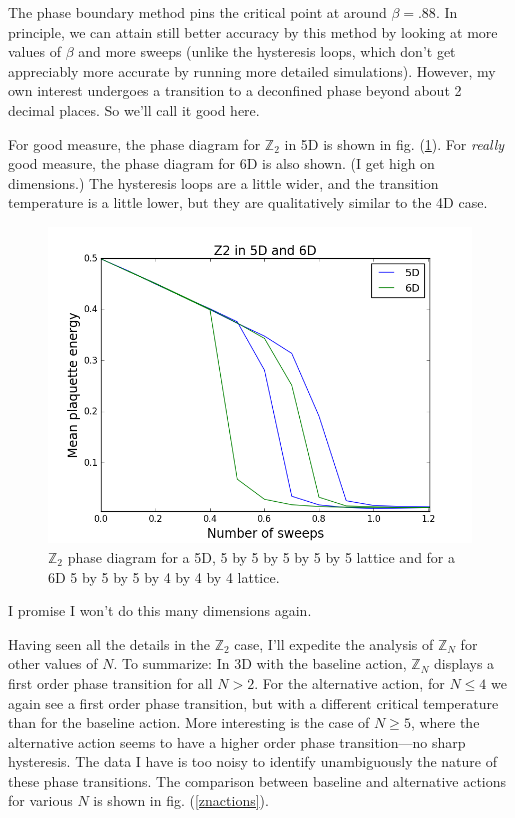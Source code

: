 \documentclass[9pt,twocolumn,twoside]{article}
\begin{document}
The phase boundary method pins the critical point at around $\beta= .88$.  In principle, we can attain still better accuracy by this method by looking at more values of $\beta$ and more sweeps (unlike the hysteresis loops, which don't get appreciably more accurate by running more detailed simulations).  However, my own interest undergoes a transition to a deconfined phase beyond about 2 decimal places.  So we'll call it good here. 

For good measure, the phase diagram for $\mathbb{Z}_2$ in 5D is shown in fig. (\ref{z2,56d}).  For \textit{really} good measure, the phase diagram for 6D is also shown.  (I get high on dimensions.)  The hysteresis loops are a little wider, and the transition temperature is a little lower, but they are qualitatively similar to the 4D case. 

\begin{figure}[h!]
	\begin{centering}
	\includegraphics[width=\columnwidth]{z2,56d}
	\caption{$\mathbb{Z}_2$ phase diagram for a 5D, 5 by 5 by 5 by 5 by 5 lattice and for a 6D 5 by 5 by 5 by 4 by 4 by 4 lattice.}
	\label{z2,56d}
	\end{centering}
\end{figure}

I promise I won't do this many dimensions again.  

Having seen all the details in the $\mathbb{Z}_2$ case, I'll expedite the analysis of $\mathbb{Z}_N$ for other values of $N$.  To summarize:  In 3D with the baseline action, $\mathbb{Z}_N$ displays a first order phase transition for all $N>2$.  For the alternative action, for $N\leq4$ we again see a first order phase transition, but with a different critical temperature than for the baseline action.  More interesting is the case of $N\geq 5$, where the alternative action seems to have a higher order phase transition---no sharp hysteresis.  The data I have is too noisy to identify unambiguously the nature of these phase transitions. The comparison between baseline and alternative actions for various $N$ is shown in fig. (\ref{znactions}).  
\end{document}
